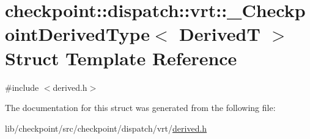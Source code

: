 \hypertarget{structcheckpoint_1_1dispatch_1_1vrt_1_1___checkpoint_derived_type}{}\section{checkpoint\+:\+:dispatch\+:\+:vrt\+:\+:\+\_\+\+Checkpoint\+Derived\+Type$<$ DerivedT $>$ Struct Template Reference}
\label{structcheckpoint_1_1dispatch_1_1vrt_1_1___checkpoint_derived_type}


{\ttfamily \#include $<$derived.\+h$>$}



The documentation for this struct was generated from the following file\+:\begin{DoxyCompactItemize}
\item 
lib/checkpoint/src/checkpoint/dispatch/vrt/\hyperlink{derived_8h}{derived.\+h}\end{DoxyCompactItemize}

